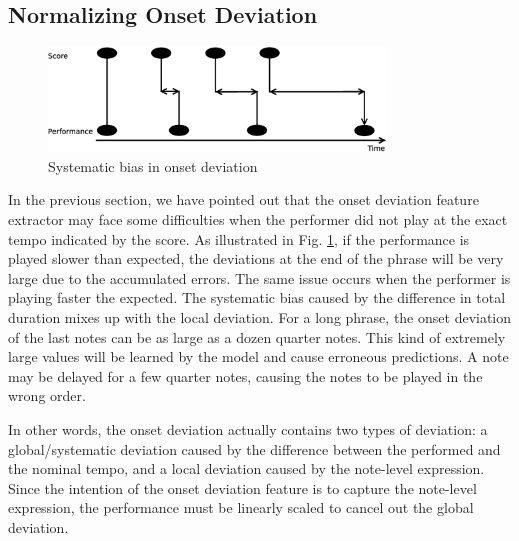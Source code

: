    \subsection{Normalizing Onset Deviation}
   \label{sec:normalize}
\begin{figure}[tp]
   \begin{center}
      \includegraphics[width=0.8\textwidth]{fig/prob_onset_diff}

   \end{center}
   \caption{Systematic bias in onset deviation }
   \label{fig:normalizationprob}
\end{figure}
%
In the previous section, we have pointed out that the onset deviation feature extractor may face some difficulties when the performer did not play at the exact tempo indicated by the score. As illustrated in Fig. \ref{fig:normalizationprob}, if the performance is played slower than expected, the deviations at the end of the phrase will be very large due to the accumulated errors. The same issue occurs when the performer is playing faster the expected. The systematic bias caused by the difference in total duration mixes up with the local deviation. For a long phrase, the onset deviation of the last notes can be as large as a dozen quarter notes. This kind of extremely large values will be learned by the model and cause erroneous predictions. A note may be delayed for a few quarter notes, causing the notes to be played in the wrong order.
 
In other words, the onset deviation actually contains two types of deviation: a global/systematic deviation caused by the difference between the performed and the nominal tempo, and a local deviation caused by the note-level expression. Since the intention of the onset deviation feature is to capture the note-level expression, the performance must be linearly scaled to cancel out the global deviation.

